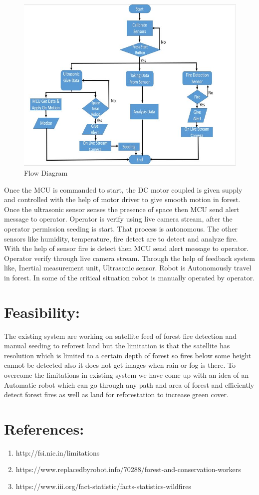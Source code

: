 \documentclass{report}
\begin{document}
\begin{figure}
	\centering
	\includegraphics{implementation2.jpg}
	\caption{Flow Diagram}
	\label{image_2} %
\end{figure}

Once the MCU is commanded to start, the DC motor coupled is given supply and controlled with the help of motor driver to give smooth motion in forest.
Once the ultrasonic sensor senses the presence of space then MCU send alert message to operator. Operator is verify using live camera stream, after the operator permission seeding is start. That process is autonomous.
The other sensors like humidity, temperature, fire detect are to detect and analyze fire.
With the help of sensor fire is detect then MCU send alert message to operator. Operator verify through live camera stream.
Through the help of feedback system like, Inertial measurement unit, Ultrasonic sensor. Robot is Autonomously travel in forest.
In some of the critical  situation robot is manually operated by operator.

\section{Feasibility:}
The existing system are working on satellite feed of forest fire detection and manual seeding to reforest land but the limitation is that the satellite has resolution which is limited to a certain depth of forest so fires below some height cannot be detected also it does not get images when rain or fog is there.
To overcome the limitations in existing system we have come up with an idea of an Automatic robot which can go through any path and area of forest and efficiently detect forest fires as well as land for reforestation to increase green cover.

\section{References:}
\begin{enumerate}
	\item http://fsi.nic.in/limitations
	\item https://www.replacedbyrobot.info/70288/forest-and-conservation-workers
	\item https://www.iii.org/fact-statistic/facts-statistics-wildfires
\end{enumerate}
 
\end{document}
